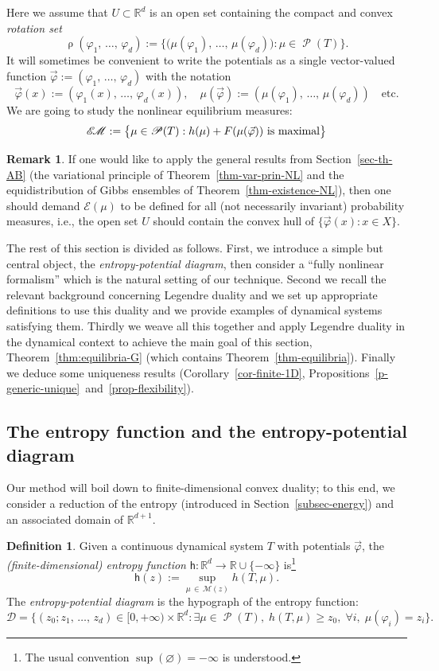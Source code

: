 \documentclass[10pt]{amsart}
\theoremstyle{definition}\newtheorem{defi}[theo]{Definition}\newtheorem{rema}[theo]{Remark}\newtheorem{exam}[theo]{Example}\newtheorem{exem}[theo]{Example}\newtheorem{nota}[theo]{Notation}
\theoremstyle{plain}
\theoremstyle{plain}
\newcommand\vpot{\vec\pot}
\newcommand\Prob{{\operatorname{\mathscr{P}}}}
\newcommand{\rs}{\operatorname{\rho}}
\newcommand{\hf}{\mathsf{h}}
\newcommand{\EM}{\mathscr{E\kern-2pt M}}
\newcommand{\pot}{\varphi}
\newcommand*\8{\infty}
\newcommand\RR{\mathbb{R}}
\newcommand{\En}{\mathcal{E}}
\newcommand{\cD}{\mathcal{D}}
\newcommand{\cM}{\mathcal{M}}
\let\oldexists\exists
\renewcommand*{\exists}{\mathrel{\oldexists}}
\let\oldforall\forall
\renewcommand*{\forall}{\mathrel{\oldforall}}
\begin{document}
Here we assume that $U\subset\RR^d$ is an open set containing the compact and convex \emph{rotation set}
\[
\rs(\pot_1,\,\dots,\,\pot_d) := \big\{\big(\mu(\pot_1),\,\dots,\,\mu(\pot_d)\big) \colon \mu\in\Prob(T) \big\}.
\]
It will sometimes be convenient to write the potentials as a single vector-valued function $\vpot := (\pot_1,\,\dots,\,\pot_d)$ with the notation
\[
\vpot(x) := (\pot_1(x),\,\dots,\,\pot_d(x)), \quad \mu(\vpot):=(\mu(\pot_1),\,\dots,\,\mu(\pot_d))\quad \text{etc.}
\]
We are going to study the nonlinear equilibrium measures:
\[
\EM := \big\{\mu\in\Prob(T):h(\mu)+F(\mu(\vpot))\text{ is maximal}\big\}
\]

\begin{rema}
If one would like to apply the general results from Section~\ref{sec-th-AB} (the variational principle of Theorem~\ref{thm-var-prin-NL} and the equidistribution of Gibbs ensembles of Theorem~\ref{thm-existence-NL}), then one should demand $\En(\mu)$ to be defined for all (not necessarily invariant) probability measures, i.e., the open set $U$ should contain the convex hull of $\{\vpot(x):x\in X\}$.
\end{rema}


The rest of this section is divided as follows. First, we introduce a simple but central object, the \emph{entropy-potential diagram}, then consider a ``fully nonlinear formalism'' which is the natural setting of our technique. Second we recall the relevant background concerning Legendre duality and we set up appropriate definitions to use this duality and we provide examples of dynamical systems satisfying them. Thirdly we weave all this together and apply Legendre duality in the dynamical context to achieve the main goal of this section, Theorem~\ref{thm:equilibria-G} (which contains Theorem~\ref{thm-equilibria}). Finally we deduce some uniqueness results (Corollary~\ref{cor-finite-1D}, Propositions~\ref{p-generic-unique}~and~\ref{prop-flexibility}).



\subsection{The entropy function and the entropy-potential diagram}

Our method will boil down to finite-dimensional convex duality; to this end, we consider a reduction of the entropy (introduced in Section~\ref{subsec-energy}) and an associated domain of $\RR^{d+1}$.

\begin{defi}\label{defi-entropy}
Given a continuous dynamical system $T$ with potentials $\vpot$, the \emph{(finite-dimensional) entropy function} $\hf:\RR^d\to\RR\cup\{-\infty\}$ is\footnote{The usual convention $\sup(\varnothing) = -\infty$ is understood.}
\[
\hf(z) := \sup_{\mu\,\in\,\cM(z)} h(T,\mu).
\]
The \emph{entropy-potential diagram} is the hypograph of the entropy function:
\[
\cD = \big\{ (z_0;z_1,\,\dots,\,z_d) \in [0,+\infty) \times \RR^d \colon \exists \mu\in \Prob(T),\; h(T,\mu)\ge z_0,\;\forall i,\;\mu(\pot_i)=z_i\big\}.
\]
\end{defi}
\end{document}
